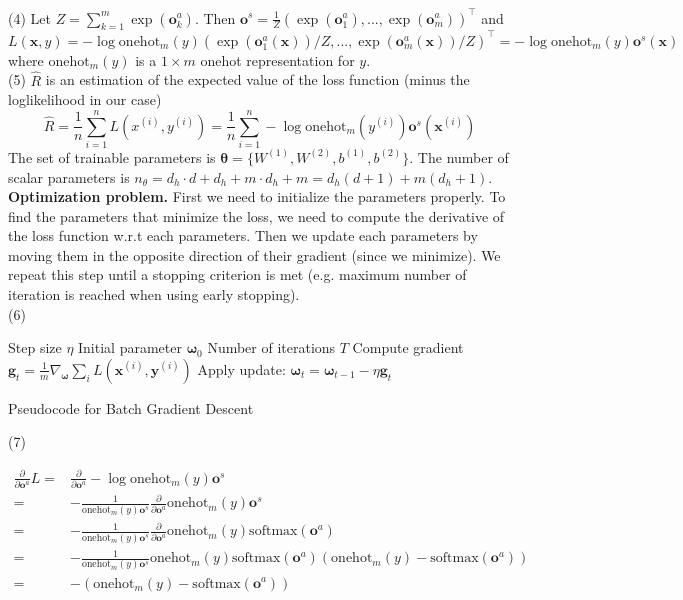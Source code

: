 \documentclass[11pt,english]{article}
\newcommand{\softmax}{\mathrm{softmax}}
\newcommand{\onehot}{\mathrm{onehot}}
\newcommand{\pd}[1]{\frac{\partial}{\partial {#1}}}
\begin{document}
(4) Let $Z=\sum_{k=1}^m \exp(\bm{o}_k^a)$. Then $\bm{o}^s=\frac{1}{Z}(\exp(\bm{o}_1^a),...,\exp(\bm{o}_m^a))^\top$ and 
\[
	L(\bm{x}, y) = -\log \onehot_m(y) (\exp(\bm{o}_1^a(\bm{x}))/Z,...,\exp(\bm{o}_m^a(\bm{x}))/Z)^\top
	= -\log \onehot_m(y)\bm{o}^s(\bm{x})
\]
where $\onehot_m(y)$ is a $1 \times  m$ onehot representation for $y$.\\
 
(5) $\hat{R}$ is an estimation of the expected value of the loss function (minus the loglikelihood in our case)
\[
	\hat{R} = \frac{1}{n}\sum_{i=1}^n L(x^{(i)}, y^{(i)})=\frac{1}{n}\sum_{i=1}^n 
	-\log \onehot_m(y^{(i)})\bm{o}^s(\bm{x}^{(i)})
\]
The set of trainable parameters is $\bm{\theta}=\{W^{(1)}, W^{(2)}, b^{(1)}, b^{(2)}\}$. The number of scalar parameters is $n_\theta=d_h\cdot d + d_h + m\cdot d_h + m=d_h(d+1)+m(d_h+1)$. \\

\textbf{Optimization problem.} First we need to initialize the parameters properly. To find the parameters that minimize the loss, we need to compute the derivative of the loss function w.r.t each parameters. Then we update each parameters by moving them in the opposite direction of their gradient (since we minimize). We repeat this step until a stopping criterion is met (e.g. maximum number of iteration is reached when using early stopping).\\

(6)
\begin{algorithm}[H]
	\begin{algorithmic}
		\REQUIRE Step size $\eta$
		\REQUIRE Initial parameter $\bm{\omega}_0$
		\REQUIRE Number of iterations $T$
		\STATE Compute gradient $\bm{g}_t=\frac{1}{m}\nabla_{\bm{\omega}}\sum_i L(\bm{x}^{(i)}, \bm{y}^{(i)})$ 
		\STATE Apply update: $\bm{\omega}_t=\bm{\omega}_{t-1}-\eta \bm{g}_t$
		\ENDFOR
	\end{algorithmic}
	\caption{Pseudocode for Batch Gradient Descent}
	\label{alg:seq}
\end{algorithm}

(7) 

\begin{equation}
\begin{split}
	\pd{\bm{o}^a}L
	=& \pd{\bm{o}^a} -\log \onehot_m(y)\bm{o}^s\\
	=& -\frac{1}{\onehot_m(y)\bm{o}^s}\pd{\bm{o}^a} \onehot_m(y)\bm{o}^s \\
	=& -\frac{1}{\onehot_m(y)\bm{o}^s}\pd{\bm{o}^a} \onehot_m(y)\softmax(\bm{o}^a) \\ 
	=& -\frac{1}{\onehot_m(y)\bm{o}^s}\onehot_m(y) \softmax(\bm{o}^a)(\onehot_m(y)-\softmax(\bm{o}^a)) \\
	=& - (\onehot_m(y)-\softmax(\bm{o}^a))
\end{split}
\end{equation}
\end{document}
